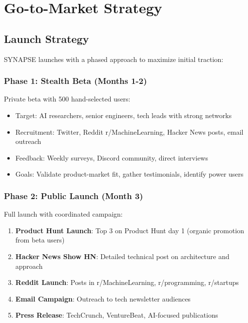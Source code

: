 \documentclass{report}
\begin{document}
\newpage

\chapter{Go-to-Market Strategy}

\section{Launch Strategy}

SYNAPSE launches with a phased approach to maximize initial traction:

\subsection{Phase 1: Stealth Beta (Months 1-2)}

Private beta with 500 hand-selected users:

\begin{itemize}
    \item Target: AI researchers, senior engineers, tech leads with strong networks
    \item Recruitment: Twitter, Reddit r/MachineLearning, Hacker News posts, email outreach
    \item Feedback: Weekly surveys, Discord community, direct interviews
    \item Goals: Validate product-market fit, gather testimonials, identify power users
\end{itemize}

\subsection{Phase 2: Public Launch (Month 3)}

Full launch with coordinated campaign:

\begin{enumerate}
    \item \textbf{Product Hunt Launch}: Top 3 on Product Hunt day 1 (organic promotion from beta users)
    \item \textbf{Hacker News Show HN}: Detailed technical post on architecture and approach
    \item \textbf{Reddit Launch}: Posts in r/MachineLearning, r/programming, r/startups
    \item \textbf{Email Campaign}: Outreach to tech newsletter audiences
    \item \textbf{Press Release}: TechCrunch, VentureBeat, AI-focused publications
\end{enumerate}
\end{document}
